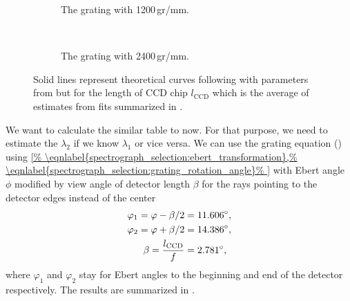 \begin{figure}
	\centering
	\begin{subfigure}[b]{1\textwidth}
		\centering
		
		\caption{The grating with 1200\,gr/mm.}
		\label{\figlabel{spectrograph_selection:dipsersion_range_1200}}
	\end{subfigure}
	\\
	\begin{subfigure}[b]{1\textwidth}
		\centering
		
		\caption{The grating with 2400\,gr/mm.}
		\label{\figlabel{spectrograph_selection:dipsersion_range_2400}}
	\end{subfigure}
	\caption[%
		Plots of spectral ranges captured by the detector in dependence on
		the central detected wavelength for different gratings.%
	]{%
		Solid lines represent theoretical curves following
		with parameters from
		but for the length of CCD chip $l_\text{CCD}$ which is the average of
		estimates from fits summarized in
		.
	}
	\label{\figlabel{spectrograph_selection:dispersion_range}}
\end{figure}

We want to calculate the similar table to
now.
For that purpose, we need to estimate the $\lambda_2$ if we know $\lambda_1$ or
vice versa.
We can use the grating equation
()
using
\cref{%
	\eqnlabel{spectrograph_selection:ebert_transformation},%
	\eqnlabel{spectrograph_selection:grating_rotation_angle}%
}
with Ebert angle $\phi$ modified by view angle of detector length
$\beta$ for the rays pointing to the detector edges instead of the center
\begin{align}
	\begin{split}
		\varphi_1 = \varphi - \beta / 2    &= 11.606^\circ, \\
		\varphi_2 = \varphi + \beta / 2    &= 14.386^\circ, \\
		\beta     = \frac{l_\text{CCD}}{f} &=  2.781^\circ,
	\end{split}
	\label{\eqnlabel{spectrograph_selection:modified_ebert_angles}}
\end{align}
where $\varphi_1$ and $\varphi_2$ stay for Ebert angles to the beginning and
end of the detector respectively.
The results are summarized in
.


